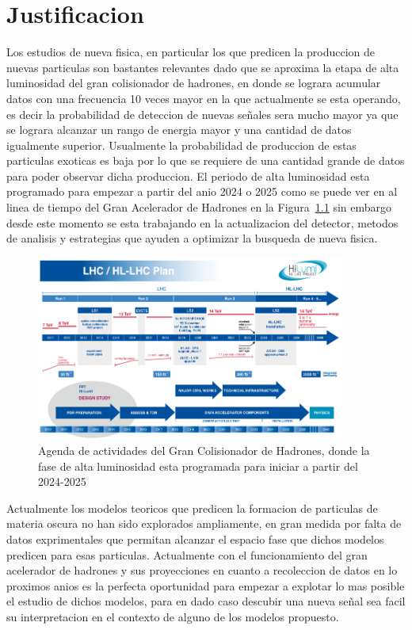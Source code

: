 \chapter{Justificacion}

Los estudios de nueva fisica, en particular los que predicen la produccion de nuevas particulas son bastantes relevantes dado que se aproxima la etapa de alta luminosidad del gran colisionador de hadrones, en donde se lograra acumular datos con una frecuencia 10 veces mayor en la que actualmente se esta operando, es decir la probabilidad de deteccion de nuevas se\~nales sera mucho mayor ya que se lograra alcanzar un rango de energia mayor y una cantidad de datos igualmente superior. Usualmente la probabilidad de produccion de estas particulas exoticas es baja por lo que se requiere de una cantidad grande de datos para poder observar dicha produccion. El periodo de alta luminosidad esta programado para empezar a partir del anio 2024 o 2025 como se puede ver en al linea de tiempo del Gran Acelerador de Hadrones en la Figura~\ref{fig:lhctimeline} sin embargo desde este momento se esta trabajando en la actualizacion del detector, metodos de analisis y estrategias que ayuden a optimizar la busqueda de nueva fisica. 

\begin{figure}
\begin{center}
  \includegraphics[width=4.0in]{lhc_timeline.png}
  \caption{Agenda de actividades del Gran Colisionador de Hadrones, donde la fase de alta luminosidad esta programada para iniciar a partir del 2024-2025}
  \label{fig:lhctimeline}
\end{center}
\end{figure}


Actualmente los modelos teoricos que predicen la formacion de particulas de materia oscura no han sido explorados ampliamente, en gran medida por falta de datos exprimentales que permitan alcanzar el espacio fase que dichos modelos predicen para esas particulas.  Actualmente con el funcionamiento del gran acelerador de hadrones y sus proyecciones en cuanto a recoleccion de datos en lo proximos anios es la perfecta oportunidad para empezar a explotar lo mas posible el estudio de dichos modelos, para en dado caso descubir una nueva se\~nal sea facil su interpretacion en el contexto de alguno de los modelos propuesto.


